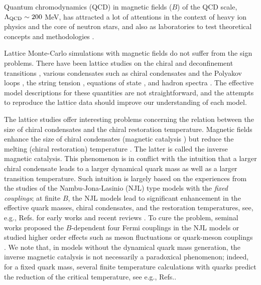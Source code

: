 Quantum chromodynamics (QCD) in magnetic fields ($B$) of the QCD scale, $\Lambda_{\rm QCD} \sim 200$ MeV, 
has attracted a lot of attentions in the context of heavy ion physics and the core of neutron stars, and also as laboratories to test theoretical concepts and methodologies  \cite{Miransky:2015ava,Fukushima:2018grm}. 

Lattice Monte-Carlo simulations with magnetic fields do not suffer from the sign problems. 
There have been lattice studies on the chiral and deconfinement transitions \cite{Bali:2011qj,DElia:2018xwo}, various condensates such as chiral condensates \cite{Buividovich:2008wf,Bali:2012zg} and the Polyakov loops \cite{Bruckmann:2013oba}, the string tension \cite{Bonati:2014ksa,Bonati:2016kxj,Bonati:2018uwh}, equations of state \cite{Bali:2014kia}, and hadron spectra \cite{Hidaka:2012mz,Luschevskaya:2018chr,Andreichikov:2016ayj,Luschevskaya:2016epp,Hattori:2019ijy,Bali:2017ian,Ding:2020hxw}. 
The effective model descriptions for these quantities are not straightforward, and the attempts to reproduce the lattice data should improve our understanding of each model.

The lattice studies offer interesting problems concerning the relation between the size of chiral condensates and the chiral restoration temperature. 
Magnetic fields enhance the size of chiral condensates (magnetic catalysis \cite{Klimenko:1991he,Gusynin:1995nb,Suganuma:1990nn}) but reduce the melting (chiral restoration) temperature \cite{Bali:2011qj}. 
The latter is called the inverse magnetic catalysis. 
This phenomenon is in conflict with 
the intuition that a larger chiral condensate leads to a larger dynamical quark mass as well as a larger transition temperature. 
Such intuition is largely based on the experiences from the studies of the Nambu-Jona-Lasinio (NJL) type models with the {\it fixed couplings}; 
at finite $B$, the NJL models lead to significant enhancement in the effective quark masses, chiral condensates, and the restoration temperatures, see, e.g., Refs. \cite{Mizher:2010zb,Gatto:2010pt} 
for early works and recent reviews \cite{Cao:2021rwx,Bandyopadhyay:2020zte}. 
To cure the problem, 
seminal works proposed the $B$-dependent four Fermi couplings in the NJL models \cite{Farias:2014eca,Ferreira:2014kpa,Ferreira:2013tba,Endrodi:2019whh} 
or studied higher order effects such as meson fluctuations or quark-meson couplings \cite{Mao:2016lsr,Mao:2016fha,Ayala:2018zat,Ayala:2020muk}.
We note that, in models without the dynamical quark mass generation, the inverse magnetic catalysis is not necessarily a paradoxical phenomenon;
indeed, for a fixed quark mass, several finite temperature calculations with quarks predict the reduction of the critical temperature, see e.g., Refs.\cite{Fraga:2012fs,Ozaki:2013sfa}.


